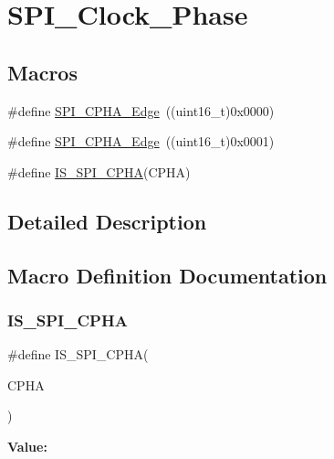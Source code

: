 \hypertarget{group___s_p_i___clock___phase}{}\section{S\+P\+I\+\_\+\+Clock\+\_\+\+Phase}
\label{group___s_p_i___clock___phase}
\subsection*{Macros}
\begin{DoxyCompactItemize}
\item 
\#define \mbox{\hyperlink{group___s_p_i___clock___phase_gaade9d9555fac8a302bde5c94da9c7292}{S\+P\+I\+\_\+\+C\+P\+H\+A\+\_\+Edge}}~((uint16\+\_\+t)0x0000)
\item 
\#define \mbox{\hyperlink{group___s_p_i___clock___phase_ga7543f88bf05a08705eb4203862dcebdf}{S\+P\+I\+\_\+\+C\+P\+H\+A\+\_\+Edge}}~((uint16\+\_\+t)0x0001)
\item 
\#define \mbox{\hyperlink{group___s_p_i___clock___phase_ga6441f08edf79dd5b243c54b888d3cbf7}{I\+S\+\_\+\+S\+P\+I\+\_\+\+C\+P\+HA}}(C\+P\+HA)
\end{DoxyCompactItemize}


\subsection{Detailed Description}


\subsection{Macro Definition Documentation}
\mbox{\label{group___s_p_i___clock___phase_ga6441f08edf79dd5b243c54b888d3cbf7}} 
\subsubsection{\texorpdfstring{IS\_SPI\_CPHA}{IS\_SPI\_CPHA}}
{\footnotesize\ttfamily \#define I\+S\+\_\+\+S\+P\+I\+\_\+\+C\+P\+HA(\begin{DoxyParamCaption}\item[{}]{C\+P\+HA }\end{DoxyParamCaption})}

{\bfseries Value\+:}
\begin{DoxyCode}{0}

\end{DoxyCode}
\mbox{\label{group___s_p_i___clock___phase_gaade9d9555fac8a302bde5c94da9c7292}} 
